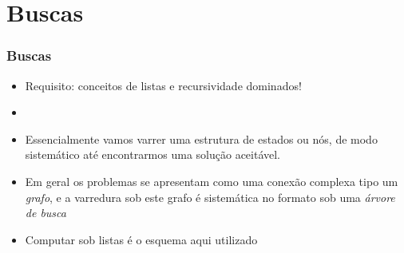 \section{Buscas}
\begin{frame}

    \frametitle{Buscas}

   \begin{block}{}
     \begin{itemize}
      \item Requisito: conceitos de listas e recursividade  dominados!
      \item  
     \item Essencialmente vamos varrer uma estrutura
     de estados ou nós, de modo sistemático até encontrarmos
     uma solução aceitável.
         

      \item Em geral os problemas 
      se apresentam como uma conexão complexa tipo um \textit{grafo},
      e a varredura sob este grafo é sistemática
      no formato sob uma \textit{árvore de busca}
      
       \item Computar sob listas é o esquema aqui utilizado

    \end{itemize}
    
    \end{block}
    
\end{frame}

